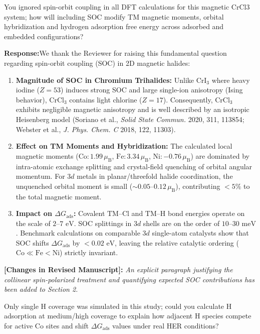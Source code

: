\documentclass[11pt, sans, a4paper]{moderncv}
\newcommand{\response}{\vspace{0.4em}\noindent\textbf{\color{actionblue}Response:}\hspace{0.5em}}
\newcommand{\manuscriptchange}[1]{\vspace{0.3em}\noindent\textbf{\color{acsblue}[Changes in Revised Manuscript]:} \textit{#1}\vspace{0.4em}}
\begin{document}
\begin{reviewercomment}
You ignored spin-orbit coupling in all DFT calculations for this magnetic CrCl3 system; how will including SOC modify TM magnetic moments, orbital hybridization and hydrogen adsorption free energy across adsorbed and embedded configurations?
\end{reviewercomment}

\response We thank the Reviewer for raising this fundamental question regarding spin-orbit coupling (SOC) in 2D magnetic halides:
\begin{enumerate}[leftmargin=1.5em, itemsep=0.2em]
    \item \textbf{Magnitude of SOC in Chromium Trihalides:} Unlike $\text{CrI}_3$ where heavy iodine ($Z=53$) induces strong SOC and large single-ion anisotropy (Ising behavior), $\text{CrCl}_3$ contains light chlorine ($Z=17$). Consequently, $\text{CrCl}_3$ exhibits negligible magnetic anisotropy and is well described by an isotropic Heisenberg model (Soriano et al., \textit{Solid State Commun.} 2020, 311, 113854; Webster et al., \textit{J. Phys. Chem. C} 2018, 122, 11303).
    \item \textbf{Effect on TM Moments and Hybridization:} The calculated local magnetic moments ($\text{Co}: 1.99\,\mu_{\mathrm{B}}$, $\text{Fe}: 3.34\,\mu_{\mathrm{B}}$, $\text{Ni}: -0.76\,\mu_{\mathrm{B}}$) are dominated by intra-atomic exchange splitting and crystal-field quenching of orbital angular momentum. For $3d$ metals in planar/threefold halide coordination, the unquenched orbital moment is small ($\sim 0.05\text{--}0.12\,\mu_{\mathrm{B}}$), contributing $<5\%$ to the total magnetic moment.
    \item \textbf{Impact on $\Delta G_{\mathrm{ads}}$:} Covalent $\text{TM--Cl}$ and $\text{TM--H}$ bond energies operate on the scale of $2\text{--}7\text{ eV}$. SOC splittings in $3d$ shells are on the order of $10\text{--}30\text{ meV}$. Benchmark calculations on comparable $3d$ single-atom catalysts show that SOC shifts $\Delta G_{\mathrm{ads}}$ by $<0.02\text{ eV}$, leaving the relative catalytic ordering ($\text{Co} \ll \text{Fe} < \text{Ni}$) strictly invariant.
\end{enumerate}

\manuscriptchange{An explicit paragraph justifying the collinear spin-polarized treatment and quantifying expected SOC contributions has been added to Section 2.}

\begin{reviewercomment}
Only single H coverage was simulated in this study; could you calculate H adsorption at medium/high coverage to explain how adjacent H species compete for active Co sites and shift $\Delta G_{\mathrm{ads}}$ values under real HER conditions?
\end{reviewercomment}
\end{document}
